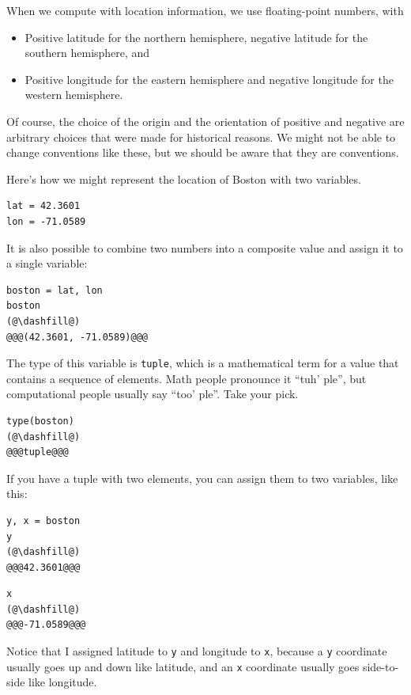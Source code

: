 When we compute with location information, we use floating-point
numbers, with

\begin{itemize}
\item
  Positive latitude for the northern hemisphere, negative latitude for
  the southern hemisphere, and
\item
  Positive longitude for the eastern hemisphere and negative longitude
  for the western hemisphere.
\end{itemize}

Of course, the choice of the origin and the orientation of positive and
negative are arbitrary choices that were made for historical reasons. We
might not be able to change conventions like these, but we should be
aware that they are conventions.

Here's how we might represent the location of Boston with two variables.

\begin{lstlisting}[]
lat = 42.3601
lon = -71.0589
\end{lstlisting}

It is also possible to combine two numbers into a composite value and
assign it to a single variable:

\begin{lstlisting}[]
boston = lat, lon
boston
(@\dashfill@)
@@@(42.3601, -71.0589)@@@
\end{lstlisting}

The type of this variable is \passthrough{\lstinline!tuple!}, which is a
mathematical term for a value that contains a sequence of elements. Math
people pronounce it ``tuh' ple'', but computational people usually say
``too' ple''. Take your pick.

\begin{lstlisting}[]
type(boston)
(@\dashfill@)
@@@tuple@@@
\end{lstlisting}

If you have a tuple with two elements, you can assign them to two
variables, like this:

\begin{lstlisting}[]
y, x = boston
y
(@\dashfill@)
@@@42.3601@@@
\end{lstlisting}

\begin{lstlisting}[]
x
(@\dashfill@)
@@@-71.0589@@@
\end{lstlisting}

Notice that I assigned latitude to \passthrough{\lstinline!y!} and
longitude to \passthrough{\lstinline!x!}, because a
\passthrough{\lstinline!y!} coordinate usually goes up and down like
latitude, and an \passthrough{\lstinline!x!} coordinate usually goes
side-to-side like longitude.

